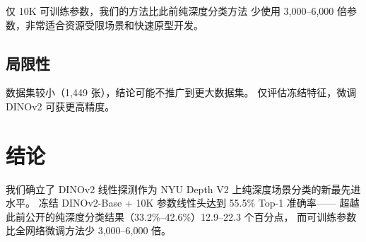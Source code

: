\documentclass[conference, a4paper]{IEEEtran}
\begin{document}
仅 10K 可训练参数，我们的方法比此前纯深度分类方法
少使用 3,000--6,000 倍参数，非常适合资源受限场景和快速原型开发。

\subsection{局限性}

数据集较小（1,449 张），结论可能不推广到更大数据集。
仅评估冻结特征，微调 DINOv2 可获更高精度。

\section{结论}

我们确立了 DINOv2 线性探测作为 NYU Depth V2 上纯深度场景分类的新最先进水平。
冻结 DINOv2-Base + 10K 参数线性头达到 55.5\% Top-1 准确率——
超越此前公开的纯深度分类结果（33.2\%--42.6\%）12.9--22.3 个百分点，
而可训练参数比全网络微调方法少 3,000--6,000 倍。
\end{document}
